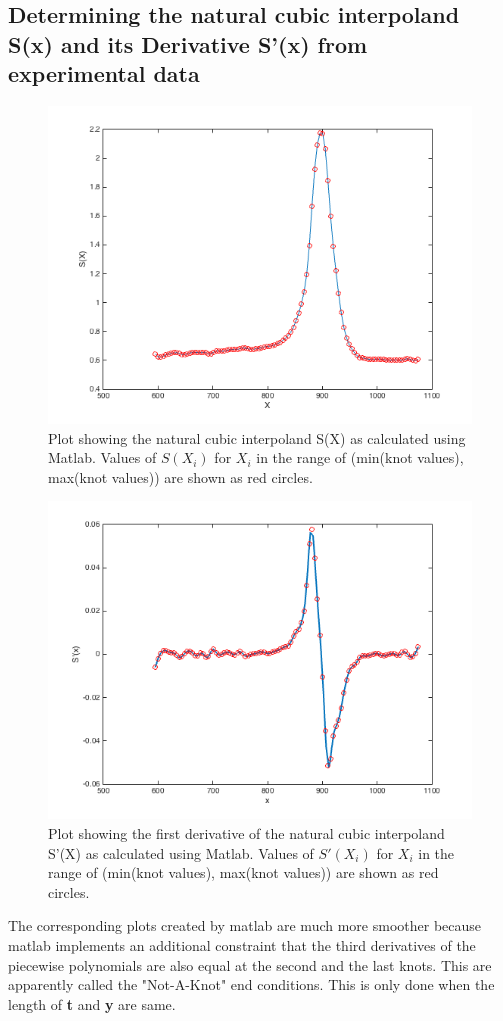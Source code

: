 \documentclass[a4paper,11pt]{article}
\begin{document}
\subsection{Determining the natural cubic interpoland S(x) and its Derivative S'(x) from experimental data}\label{prob2b}
\begin{figure}[ht]
	\center
    \includegraphics[scale=0.75]{matlabS.png}
    \caption{Plot showing the natural cubic interpoland S(X) as calculated using Matlab. Values of $S(X_i)$ for $X_i$ in the range of (min(knot values), max(knot values)) are shown as red circles.}
	\label{fig:smatlab}
\end{figure}
\begin{figure}[ht]
	\center
    \includegraphics[scale=0.75]{matlabS_dash.png}
    \caption{Plot showing the first derivative of the natural cubic interpoland S'(X) as calculated using Matlab. Values of $S'(X_i)$ for $X_i$ in the range of (min(knot values), max(knot values)) are shown as red circles.} 
	\label{fig:sdash_matlab}
\end{figure}
The corresponding plots created by matlab are much more smoother because matlab implements an additional constraint that the third derivatives of the piecewise polynomials are also equal at the second and the last knots. This are apparently called the "Not-A-Knot" end conditions. This is only done when the length of \textbf{t} and \textbf{y} are same.
\end{document}
